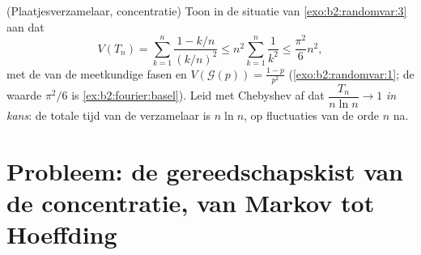 \begin{exercise}[$\star\star\star$]\label{exo:b2:randomvar:12}
(Plaatjesverzamelaar, concentratie) Toon in de situatie van
\cref{exo:b2:randomvar:3} aan dat
\[
V(T_n) = \sum_{k=1}^n\frac{1 - k/n}{(k/n)^2}
\leq n^2\sum_{k=1}^n\frac{1}{k^2} \leq \frac{\pi^2}{6}n^2,
\]
met de  van de meetkundige fasen en $V(\mathcal
G(p)) = \frac{1-p}{p^2}$ (\cref{exo:b2:randomvar:1}; de waarde
$\pi^2/6$ is \cref{ex:b2:fourier:basel}). Leid met Chebyshev af dat
$\dfrac{T_n}{n\ln n} \to 1$ \emph{in kans}: de totale tijd van de
verzamelaar is $n\ln n$, op fluctuaties van de orde $n$ na.
\end{exercise}

\section{Probleem: de gereedschapskist van de concentratie, van
Markov tot Hoeffding}

